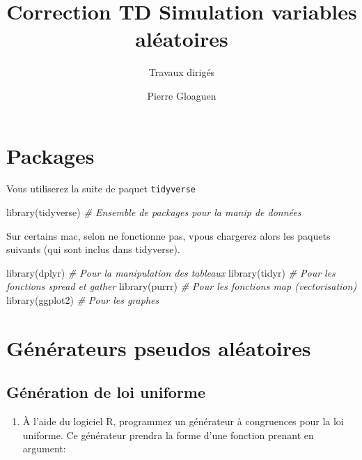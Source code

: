 \documentclass[
]{article}
\title{Correction TD Simulation variables aléatoires}
\subtitle{Travaux dirigés}
\author{Pierre Gloaguen}
\date{}
\newenvironment{Shaded}{\begin{snugshade}}{\end{snugshade}}
\newcommand{\CommentTok}[1]{\textcolor[rgb]{0.56,0.35,0.01}{\textit{#1}}}
\newcommand{\FunctionTok}[1]{\textcolor[rgb]{0.00,0.00,0.00}{#1}}
\newcommand{\NormalTok}[1]{#1}
\providecommand{\tightlist}{%
  \setlength{\itemsep}{0pt}\setlength{\parskip}{0pt}}
\begin{document}
\maketitle

{
\setcounter{tocdepth}{3}
\tableofcontents
}
\hypertarget{packages}{%
\section*{Packages}\label{packages}}

Vous utiliserez la suite de paquet \texttt{tidyverse}

\begin{Shaded}
\begin{Highlighting}[]
\FunctionTok{library}\NormalTok{(tidyverse) }\CommentTok{\# Ensemble de packages pour la manip de données}
\end{Highlighting}
\end{Shaded}

Sur certains mac, selon ne fonctionne pas, vpous chargerez alors les
paquets suivants (qui sont inclus dans tidyverse).

\begin{Shaded}
\begin{Highlighting}[]
\FunctionTok{library}\NormalTok{(dplyr) }\CommentTok{\# Pour la manipulation des tableaux}
\FunctionTok{library}\NormalTok{(tidyr) }\CommentTok{\# Pour les fonctions spread et gather}
\FunctionTok{library}\NormalTok{(purrr) }\CommentTok{\# Pour les fonctions map (vectorisation)}
\FunctionTok{library}\NormalTok{(ggplot2) }\CommentTok{\# Pour les graphes }
\end{Highlighting}
\end{Shaded}

\hypertarget{guxe9nuxe9rateurs-pseudos-aluxe9atoires}{%
\section{Générateurs pseudos
aléatoires}\label{guxe9nuxe9rateurs-pseudos-aluxe9atoires}}

\hypertarget{guxe9nuxe9ration-de-loi-uniforme}{%
\subsection{Génération de loi
uniforme}\label{guxe9nuxe9ration-de-loi-uniforme}}

\begin{enumerate}
\def\labelenumi{\arabic{enumi}.}
\tightlist
\item
  À l'aide du logiciel R, programmez un générateur à congruences pour la
  loi uniforme. Ce générateur prendra la forme d'une fonction prenant en
  argument:
\end{enumerate}
\end{document}
